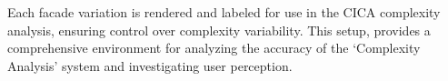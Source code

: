 Each facade variation is rendered and labeled for use in the CICA complexity analysis, ensuring control over complexity variability.
This setup, provides a comprehensive environment for analyzing the accuracy of the `Complexity Analysis' system and investigating user perception.


%
%
%







